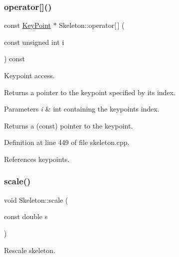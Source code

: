 \subsubsection{\texorpdfstring{operator[]()}{operator[]()}\hspace{0.1cm}{\footnotesize\ttfamily [2/2]}}
{\footnotesize\ttfamily const \mbox{\hyperlink{classassistive__rehab_1_1KeyPoint}{Key\+Point}} $\ast$ Skeleton\+::operator\mbox{[}$\,$\mbox{]} (\begin{DoxyParamCaption}\item[{const unsigned int}]{i }\end{DoxyParamCaption}) const}



Keypoint access. 

Returns a pointer to the keypoint specified by its index. 
\begin{DoxyParams}{Parameters}
{\em i} & int containing the keypoint\textquotesingle{}s index. \\
\hline
\end{DoxyParams}
\begin{DoxyReturn}{Returns}
a (const) pointer to the keypoint. 
\end{DoxyReturn}


Definition at line 449 of file skeleton.\+cpp.


\begin{DoxyCode}{0}

\end{DoxyCode}


References keypoints.

\mbox{\label{classassistive__rehab_1_1Skeleton_a21fded128e2240e4dd507030b7386670}} 
\subsubsection{\texorpdfstring{scale()}{scale()}}
{\footnotesize\ttfamily void Skeleton\+::scale (\begin{DoxyParamCaption}\item[{const double}]{s }\end{DoxyParamCaption})}



Rescale skeleton. 


